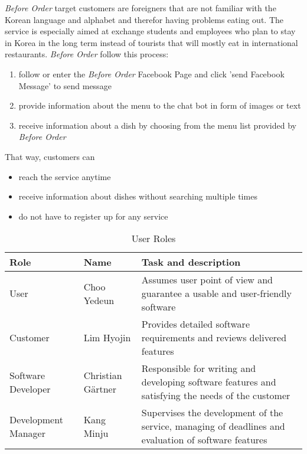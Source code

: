  \emph{Before Order} target customers are foreigners that are not familiar with the Korean language and alphabet and therefor having problems eating out. The service is especially aimed at exchange students and employees who plan to stay in Korea in the long term instead of tourists that will mostly eat in international restaurants. \emph{Before Order} follow this process: 
 
\begin{enumerate}[label=Step \arabic*:, leftmargin=1.5cm]
\item follow or enter the \emph{Before Order} Facebook Page and click 'send Facebook Message' to send message 
\item provide information about the menu to the chat bot in form of images or text
\item receive information about a dish by choosing from the menu list provided by \emph{Before Order}
\end{enumerate}

That way, customers can 
\begin{itemize}
\item reach the service anytime
\item receive information about dishes without searching multiple times
\item do not have to register up for any service 
\end{itemize}

\begin{table}[htb]
\caption{User Roles}
\begin{tabularx}{\linewidth}{|X|X|X|}
\toprule
Role                & Name              & Task and description \\
\midrule
User                & Choo Yedeun       & Assumes user point of view and guarantee a usable and user-friendly software \\
Customer            & Lim Hyojin        & Provides detailed software requirements and reviews delivered features \\
Software Developer  & Christian Gärtner & Responsible for writing and developing software features and satisfying the needs of the customer\\
Development Manager & Kang Minju        & Supervises the development of the service, managing of deadlines and evaluation of software features
\end{tabularx}
\end{table}
\FloatBarrier